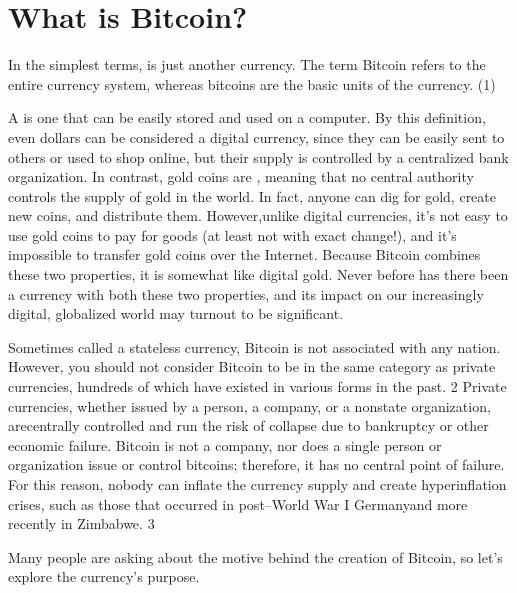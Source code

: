 \chapter{What is Bitcoin?}

\par In the simplest terms,  is just another currency. The term Bitcoin refers to the entire currency system, whereas bitcoins are the basic units of the currency. (1)

\par A  is one that can be easily stored and used on a computer. By this definition, even dollars can be considered a digital currency, since they can be easily sent to others or used to shop online, but their supply is controlled by a centralized bank organization. In contrast, gold coins are , meaning that no central authority controls the supply of gold in the world. In fact, anyone can dig for gold, create new coins, and distribute them. However,unlike digital currencies, it’s not easy to use gold coins to pay for goods (at least not with exact change!), and it’s impossible to transfer gold coins over the Internet. Because Bitcoin combines these two properties, it is somewhat like digital gold. Never before has there been a currency with both these two properties, and its impact on our increasingly digital, globalized world may turnout to be significant.

\par Sometimes called a stateless currency, Bitcoin is not associated with any nation. However, you should not consider Bitcoin to be in the same category as private currencies, hundreds of which have existed in various forms in the past. 2 Private currencies, whether issued by a person, a company, or a nonstate organization, arecentrally controlled and run the risk of collapse due to bankruptcy or other economic failure. Bitcoin is not a company, nor does a single person or organization issue or control bitcoins; therefore, it has no central point of failure. For this reason, nobody can inflate the currency supply and create hyperinflation crises, such as those that occurred in post–World War I Germanyand more recently in Zimbabwe. 3

\par Many people are asking about the motive behind the creation of Bitcoin, so let’s explore the currency’s purpose.



